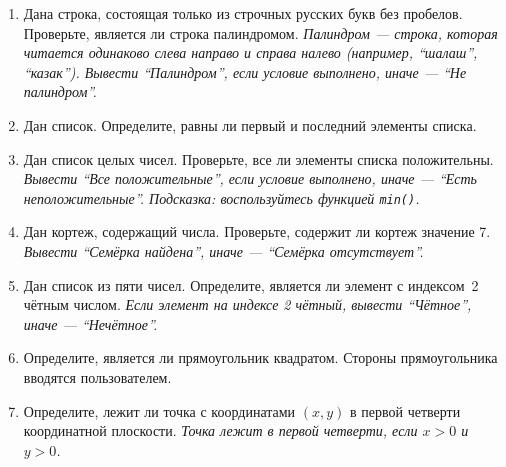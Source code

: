 \documentclass[a4paper,12pt]{article}
\theoremstyle{remark}
\begin{document}
\begin{enumerate}




    \item Дана строка, состоящая только из строчных русских букв без пробелов.
    Проверьте, является ли строка палиндромом.
    \textit{Палиндром — строка, которая читается одинаково слева направо и справа налево (например, \enquote{шалаш}, \enquote{казак}). Вывести \enquote{Палиндром}, если условие выполнено, иначе — \enquote{Не палиндром}.}

    \item Дан список. Определите, равны ли первый и последний элементы списка.

    \item Дан список целых чисел. Проверьте, все ли элементы списка положительны.
    \textit{Вывести \enquote{Все положительные}, если условие выполнено, иначе — \enquote{Есть неположительные}.
    Подсказка: воспользуйтесь функцией \texttt{min()}.}

    \item Дан кортеж, содержащий числа. Проверьте, содержит ли кортеж значение 7.
    \textit{Вывести \enquote{Семёрка найдена}, иначе — \enquote{Семёрка отсутствует}.}

    \item Дан список из пяти чисел. Определите, является ли элемент с индексом~2 чётным числом.
    \textit{Если элемент на индексе 2 чётный, вывести \enquote{Чётное}, иначе — \enquote{Нечётное}.}

    \item Определите, является ли прямоугольник квадратом. Стороны прямоугольника вводятся пользователем.

    \item Определите, лежит ли точка с координатами $(x, y)$ в первой четверти координатной плоскости. \textit{Точка лежит в первой четверти, если $x > 0$ и $y > 0$.}


\end{enumerate}
\end{document}
